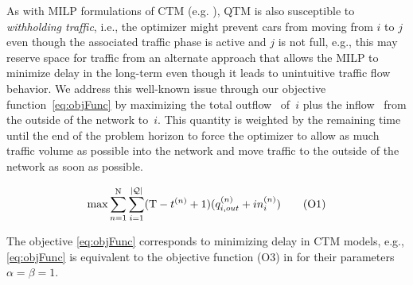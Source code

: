 As with MILP formulations of CTM (e.g. ),
QTM is also susceptible to \emph{withholding traffic}, i.e., the
optimizer might prevent cars from moving from $i$ to $j$ even though the
associated traffic phase is active and $j$ is not full, e.g., this may
reserve space for traffic from an alternate approach that allows the MILP
to minimize delay in the long-term even though it leads to unintuitive traffic
flow behavior.
%
We address this well-known issue through our objective function~\eqref{eq:objFunc} by
maximizing the total outflow~
%
%
of~$i$ plus the inflow~ from the outside of the network to~$i$.
%
This quantity is weighted by the remaining time until the end of the problem
horizon \TMAX to force the optimizer to allow as much traffic volume as possible
into the network and move traffic to the outside of the network as soon as
possible.


\begin{equation}
\max 
 \sum_{n=1}^{\mathrm{N}} \sum_{i=1}^{|\mathcal{\mathcal{Q}}|} (\mathrm{T} - t^{(n)} + 1) (q_{i,out}^{(n)} + in_{i}^{(n)})
\tag{O1}\label{eq:objFunc}
\end{equation}




The objective \eqref{eq:objFunc} corresponds to minimizing delay in CTM models,
e.g., \eqref{eq:objFunc} is equivalent to the objective function (O3) in
 for their parameters $\alpha = \beta = 1$.
%
%



